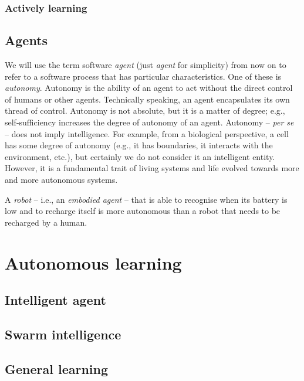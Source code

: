 \subsubsection{Actively learning}\label{subsubsec:actively-learning}

\subsection{Agents}\label{subsec:agents}
%
We will use the term software \emph{agent} (just \emph{agent} for simplicity) from now on to refer to a software process that has particular characteristics.
%
One of these is \emph{autonomy}.
%
Autonomy is the ability of an agent to act without the direct control of humans or other agents.
%
Technically speaking, an agent encapsulates its own thread of control.
%
Autonomy is not absolute, but it is a matter of degree; e.g., self-sufficiency increases the degree of autonomy of an agent.
%
Autonomy -- \emph{per se} -- does not imply intelligence.
%
For example, from a biological perspective, a cell has some degree of autonomy (e.g., it has boundaries, it interacts with the environment, etc.), but certainly we do not consider it an intelligent entity.
%
However, it is a fundamental trait of living systems and life evolved towards more and more autonomous systems.


A \emph{robot} -- i.e., an \emph{embodied agent} -- that is able to recognise when its battery is low and to recharge itself is more autonomous than a robot that needs to be recharged by a human.


\section{Autonomous learning}\label{sec:autonomous-learning}

\subsection{Intelligent agent}\label{subsec:intelligent-agent}

\subsection{}\label{subsec:mas}

\subsection{Swarm intelligence}\label{subsec:swarm-intelligence}


\subsection{General learning}\label{subsec:general-learning}

